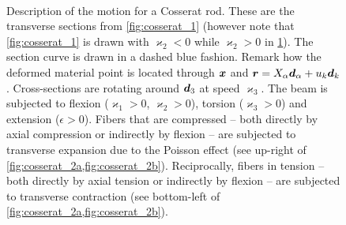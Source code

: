\begin{figure}[p]
	\begin{fullpage}
		\captionsetup[subfloat]{captionskip=10pt}
     		\centering
		\hspace{2.5cm}
		 \\
		\vspace{20pt}
		\hspace{2.5cm}
		\vspace{20pt}
		\caption{Description of the motion for a Cosserat rod. These are the transverse sections from \cref{fig:cosserat_1} (however note that \cref{fig:cosserat_1} is drawn with $\varkappa_2 < 0$ while $\varkappa_2 > 0$ in \cref{fig:cosserat_2}). The section curve is drawn in a dashed blue fashion. Remark how the deformed material point is located through $\boldsymbol{x}$ and $\boldsymbol{r} = X_{\alpha}\boldsymbol{d}_{\alpha} + u_{k}\boldsymbol{d}_{k}$. Cross-sections are rotating around $\boldsymbol{d}_3$ at speed $\varkappa_3$. The beam is subjected to flexion ($\varkappa_1 > 0$, $\varkappa_2 > 0$), torsion ($\varkappa_3 > 0$) and extension ($\epsilon > 0$). Fibers that are compressed -- both directly by axial compression or indirectly by flexion -- are subjected to transverse expansion due to the Poisson effect (see up-right of \cref{fig:cosserat_2a,fig:cosserat_2b}). Reciprocally, fibers in tension -- both directly by axial tension or indirectly by flexion -- are subjected to transverse contraction (see bottom-left of \cref{fig:cosserat_2a,fig:cosserat_2b}).}
		\label{fig:cosserat_2}    
	\end{fullpage}
\end{figure}

